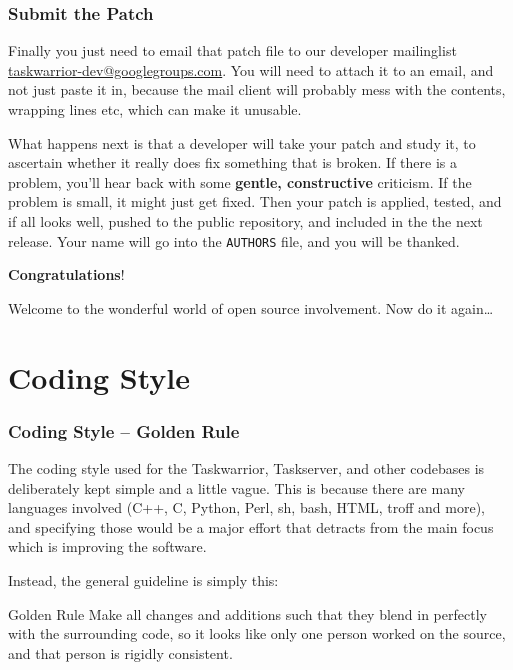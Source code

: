 \documentclass[t,handout]{beamer}
\begin{document}
\begin{frame}[fragile]\frametitle{Submit the Patch}
    Finally you just need to email that patch file to our developer mailinglist \href{mailto:taskwarrior-dev@googlegroups.com}{taskwarrior-dev@googlegroups.com}. You will need to attach it to an email, and not just paste it in, because the mail client will probably mess with the contents, wrapping lines etc, which can make it unusable.

    What happens next is that a developer will take your patch and study it, to ascertain whether it really does fix something that is broken. If there is a problem, you'll hear back with some \textbf{gentle, constructive} criticism. If the problem is small, it might just get fixed. Then your patch is applied, tested, and if all looks well, pushed to the public repository, and included in the the next release. Your name will go into the \verb=AUTHORS= file, and you will be thanked.

    \textbf{Congratulations}!

    Welcome to the wonderful world of open source involvement. Now do it again\ldots
\end{frame}

\section{Coding Style}

\begin{frame}[fragile]\frametitle{Coding Style -- Golden Rule}
    The coding style used for the Taskwarrior, Taskserver, and other codebases is deliberately kept simple and a little vague. This is because there are many languages involved (C++, C, Python, Perl, sh, bash, HTML, troff and more), and specifying those would be a major effort that detracts from the main focus which is improving the software.

    Instead, the general guideline is simply this:

    \begin{alertblock}{Golden Rule}
        Make all changes and additions such that they blend in perfectly with the surrounding code, so it looks like only one person worked on the source, and that person is rigidly consistent.
    \end{alertblock}

\end{frame}
\end{document}
